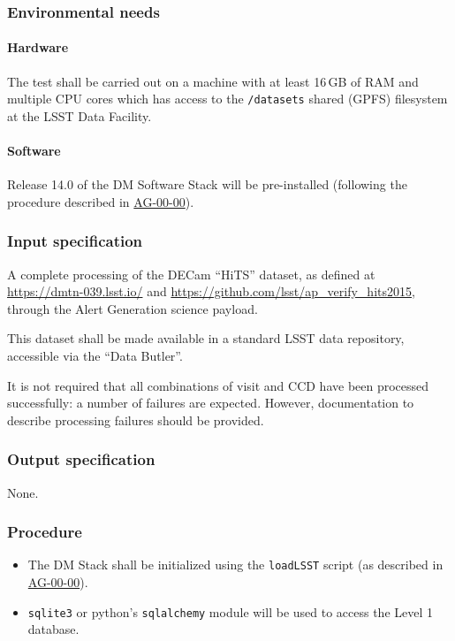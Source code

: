 \subsubsection{Environmental needs}

\paragraph{Hardware}

The test shall be carried out on a machine with at least 16\,GB of RAM and
multiple CPU cores which has access to the \texttt{/datasets} shared (GPFS)
filesystem at the LSST Data Facility.

\paragraph{Software}

Release 14.0 of the DM Software Stack will be pre-installed (following the
procedure described in \hyperref[ag-00-00]{AG-00-00}).

\subsubsection{Input specification}

A complete processing of the DECam ``HiTS'' dataset, as defined at
\url{https://dmtn-039.lsst.io/} and
\url{https://github.com/lsst/ap_verify_hits2015}, through the Alert
Generation science payload.

This dataset shall be made available in a standard LSST data repository,
accessible via the ``Data Butler''.

It is not required that all combinations of visit and CCD have been processed
successfully: a number of failures are expected. However, documentation to
describe processing failures should be provided.

\subsubsection{Output specification}

None.

\subsubsection{Procedure}

\begin{itemize}

  \item{The DM Stack shall be initialized using the \texttt{loadLSST} script
  (as described in \hyperref[ag-00-00]{AG-00-00}).}

  \item{\texttt{sqlite3} or python's \texttt{sqlalchemy} module will be used 
	  to access the Level 1 database.}

\end{itemize}

